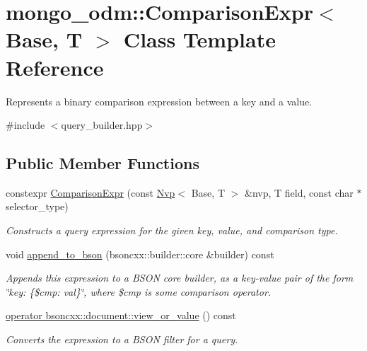 \hypertarget{classmongo__odm_1_1ComparisonExpr}{}\section{mongo\+\_\+odm\+:\+:Comparison\+Expr$<$ Base, T $>$ Class Template Reference}
\label{classmongo__odm_1_1ComparisonExpr}


Represents a binary comparison expression between a key and a value.  




{\ttfamily \#include $<$query\+\_\+builder.\+hpp$>$}

\subsection*{Public Member Functions}
\begin{DoxyCompactItemize}
\item 
constexpr \hyperlink{classmongo__odm_1_1ComparisonExpr_a00cedfa66e6c8622149739dffde2e23e}{Comparison\+Expr} (const \hyperlink{structmongo__odm_1_1Nvp}{Nvp}$<$ Base, T $>$ \&nvp, T field, const char $\ast$selector\+\_\+type)
\begin{DoxyCompactList}\small\item\em Constructs a query expression for the given key, value, and comparison type. \end{DoxyCompactList}\item 
void \hyperlink{classmongo__odm_1_1ComparisonExpr_afcfc49aa8b1a0d024fe8a8c0d2441e40}{append\+\_\+to\+\_\+bson} (bsoncxx\+::builder\+::core \&builder) const 
\begin{DoxyCompactList}\small\item\em Appends this expression to a B\+S\+ON core builder, as a key-\/value pair of the form \char`\"{}key\+: \{\$cmp\+: val\}\char`\"{}, where \$cmp is some comparison operator. \end{DoxyCompactList}\item 
\hyperlink{classmongo__odm_1_1ComparisonExpr_a8174f54d033e934b141b3a9ef4480a84}{operator bsoncxx\+::document\+::view\+\_\+or\+\_\+value} () const 
\begin{DoxyCompactList}\small\item\em Converts the expression to a B\+S\+ON filter for a query. \end{DoxyCompactList}\end{DoxyCompactItemize}


